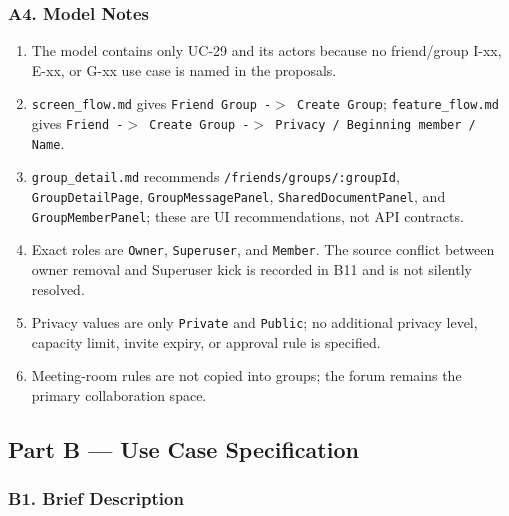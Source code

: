 \documentclass[12pt]{article}
\begin{document}
\hypertarget{sec:a4-model-notes}{}
\subsubsection*{A4. Model Notes}
\par\medskip

\begin{enumerate}
\item The model contains only UC-29 and its actors because no friend/group I-xx, E-xx, or G-xx use case is named in the proposals.
\item \texttt{screen\_flow.md} gives \texttt{Friend Group -$>$ Create Group}; \texttt{feature\_flow.md} gives \texttt{Friend -$>$ Create Group -$>$ Privacy / Beginning member / Name}.
\item \texttt{group\_detail.md} recommends \texttt{/friends/groups/:groupId}, \texttt{GroupDetailPage}, \texttt{GroupMessagePanel}, \texttt{SharedDocumentPanel}, and \texttt{GroupMemberPanel}; these are UI recommendations, not API contracts.
\item Exact roles are \texttt{Owner}, \texttt{Superuser}, and \texttt{Member}. The source conflict between owner removal and Superuser kick is recorded in B11 and is not silently resolved.
\item Privacy values are only \texttt{Private} and \texttt{Public}; no additional privacy level, capacity limit, invite expiry, or approval rule is specified.
\item Meeting-room rules are not copied into groups; the forum remains the primary collaboration space.
\end{enumerate}
\par\medskip

\hypertarget{sec:part-b-use-case-specification}{}
\subsection*{Part B --- Use Case Specification}
\par\medskip

\hypertarget{sec:b1-brief-description}{}
\subsubsection*{B1. Brief Description}
\par\medskip
\end{document}
